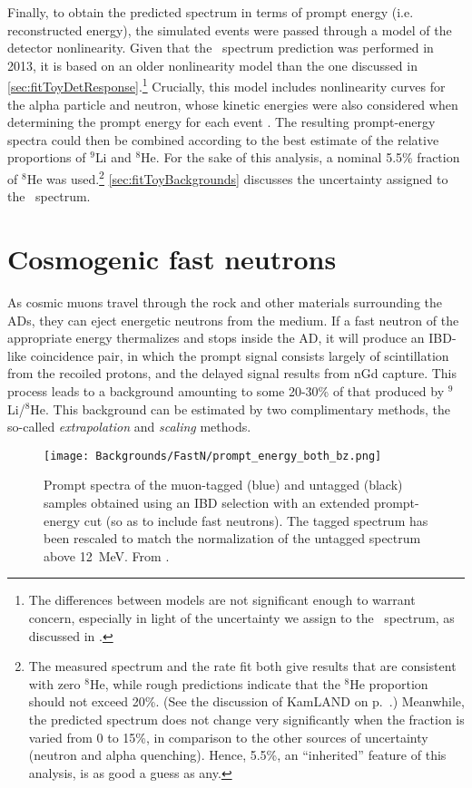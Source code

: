 \documentclass[../thesis.tex]{subfiles}
\begin{document}
Finally, to obtain the predicted spectrum in terms of prompt energy (i.e. reconstructed energy), the simulated events were passed through a model of the detector nonlinearity. Given that the \LiHe\ spectrum prediction was performed in 2013, it is based on an older nonlinearity model than the one discussed in \autoref{sec:fitToyDetResponse}.\footnote{The differences between models are not significant enough to warrant concern, especially in light of the uncertainty we assign to the \LiHe\ spectrum, as discussed in \cite{berkeley_toymc}.} Crucially, this model includes nonlinearity curves for the alpha particle and neutron, whose kinetic energies were also considered when determining the prompt energy for each event \cite{bcwNonlin}. The resulting prompt-energy spectra could then be combined according to the best estimate of the relative proportions of $^9$Li and $^8$He. For the sake of this analysis, a nominal 5.5\% fraction of $^8$He was used.\footnote{The measured spectrum and the rate fit both give results that are consistent with zero $^8$He, while rough predictions indicate that the $^8$He proportion should not exceed 20\%. (See the discussion of KamLAND on p.~\pageref{par:kamland_he8}.) Meanwhile, the predicted spectrum does not change very significantly when the fraction is varied from 0 to 15\%, in comparison to the other sources of uncertainty (neutron and alpha quenching). Hence, 5.5\%, an ``inherited'' feature of this analysis, is as good a guess as any.} \autoref{sec:fitToyBackgrounds} discusses the uncertainty assigned to the \LiHe\ spectrum.

\section{Cosmogenic fast neutrons}
\label{sec:bkgFastnOverview}

As cosmic muons travel through the rock and other materials surrounding the ADs, they can eject energetic neutrons from the medium. If a fast neutron of the appropriate energy thermalizes and stops inside the AD, it will produce an IBD-like coincidence pair, in which the prompt signal consists largely of scintillation from the recoiled protons, and the delayed signal results from nGd capture. This process leads to a background amounting to some 20-30\% of that produced by $^9$Li/$^8$He. This background can be estimated by two complimentary methods, the so-called \emph{extrapolation} and \emph{scaling} methods.

\begin{figure}[h!]
  \texttt{[image: Backgrounds/FastN/prompt\_energy\_both\_bz.png]}
  \caption{Prompt spectra of the muon-tagged (blue) and untagged (black) samples obtained using an IBD selection with an extended prompt-energy cut (so as to include fast neutrons). The tagged spectrum has been rescaled to match the normalization of the untagged spectrum above 12~MeV. From \cite{fastn}.}
  \label{fig:fastn_prompt_energy_both_bzOverview}
\end{figure}
\end{document}

